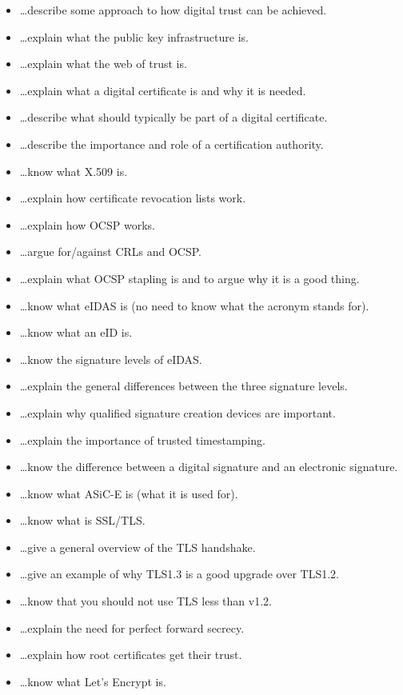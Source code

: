 \documentclass[usegeometry,parskip=half]{scrartcl}
\begin{document}
\begin{itemize}
  \item \dots{}describe some approach to how digital trust can be achieved.
  \item \dots{}explain what the public key infrastructure is.
  \item \dots{}explain what the web of trust is.
  \item \dots{}explain what a digital certificate is and why it is needed.
  \item \dots{}describe what should typically be part of a digital certificate.
  \item \dots{}describe the importance and role of a certification authority.
  \item \dots{}know what X.509 is.
  \item \dots{}explain how certificate revocation lists work.
  \item \dots{}explain how OCSP works.
  \item \dots{}argue for/against CRLs and OCSP.
  \item \dots{}explain what OCSP stapling is and to argue why it is a good thing.
  \item \dots{}know what eIDAS is (no need to know what the acronym stands for).
  \item \dots{}know what an eID is.
  \item \dots{}know the signature levels of eIDAS.
  \item \dots{}explain the general differences between the three signature levels.
  \item \dots{}explain why qualified signature creation devices are important.
  \item \dots{}explain the importance of trusted timestamping.
  \item \dots{}know the difference between a digital signature and an electronic signature.
  \item \dots{}know what ASiC-E is (what it is used for).
  \item \dots{}know what is SSL/TLS.
  \item \dots{}give a general overview of the TLS handshake.
  \item \dots{}give an example of why TLS1.3 is a good upgrade over TLS1.2.
  \item \dots{}know that you should not use TLS less than v1.2.
  \item \dots{}explain the need for perfect forward secrecy.
  \item \dots{}explain how root certificates get their trust.
  \item \dots{}know what Let's Encrypt is.

\end{itemize}
\end{document}
